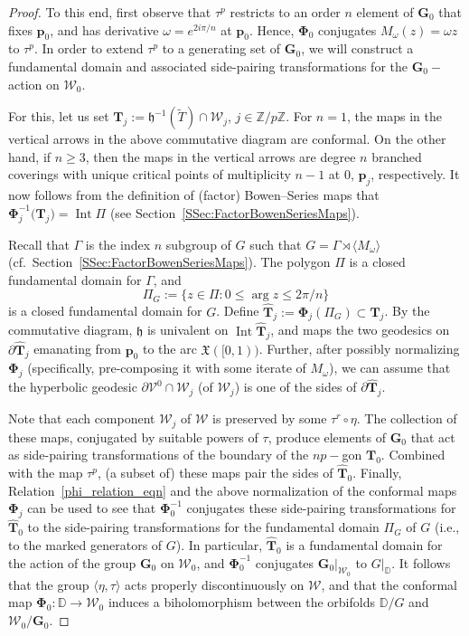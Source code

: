 \documentclass[11pt,a4paper, oneside]{amsart}
\theoremstyle{definition}
\theoremstyle{remark}
\DeclareMathOperator{\Int}{Int}
\numberwithin{equation}{section}
\def\D{{\mathbb{D}}}
\def\Z{{\mathbb{Z}}}
\def\cV{\mathcal {V}}
\def\cW{\mathcal {W}}
\renewcommand{\geq}{\geqslant}
\renewcommand{\leq}{\leqslant}
\renewcommand{\tilde}{\widetilde}
\begin{document}
\begin{proof}
To this end, first observe that $\tau^{p}$ restricts to an order $n$ element of $\pmb{G}_0$ that fixes $\pmb{p}_0$, and has derivative $\omega =e^{2i\pi/n}$ at $\pmb{p}_0$. Hence, $\pmb{\Phi}_0$ conjugates $M_\omega(z)=\omega z$ to $\tau^p$.
In order to extend $\tau^p$ to a generating set of $\pmb{G}_0$, we will construct a fundamental domain and associated side-pairing transformations for the $\pmb{G}_0-$action on $\pmb{\cW}_0$. 

For this, let us
set $\pmb{T}_j:=\mathfrak{h}^{-1}(\tilde T)\cap\pmb{\cW}_j$, $j\in\Z/p\Z$. For $n=1$, the maps in the vertical arrows in the above commutative diagram are conformal. On the other hand, if $n\geq 3$, then the maps in the vertical arrows are degree $n$ branched coverings with unique critical points of multiplicity $n-1$ at $0$, $\pmb{p}_j$, respectively. It now follows from the definition of (factor) Bowen--Series maps that $\pmb{\Phi}_j^{-1}\big(\pmb{T}_j\big)=\Int{\Pi}$ (see Section~\ref{SSec:FactorBowenSeriesMaps}).

Recall that $\Gamma$ is the index $n$ subgroup of $G$ such that $G=\Gamma\rtimes \langle M_\omega\rangle$ (cf.\ Section~\ref{SSec:FactorBowenSeriesMaps}). The polygon $\Pi$ is a closed fundamental domain for $\Gamma$, and
$$
\Pi_G:=\{z\in\Pi:0\leq \arg{z}\leq 2\pi/n\}
$$
is a closed fundamental domain for $G$. Define $\widehat{\pmb{T}}_j:=\pmb{\Phi}_j(\Pi_G)\subset\pmb{T}_j$. By the commutative diagram, $\mathfrak{h}$ is univalent on $\Int{\widehat{\pmb{T}}_j}$, and maps the two geodesics on $\partial \widehat{\pmb{T}}_j$ emanating from $\pmb{p}_0$ to the arc $\mathfrak{X}([0,1))$. Further, after possibly normalizing $\pmb{\Phi}_j$ (specifically, pre-composing it with some iterate of $M_\omega$), we can assume that the hyperbolic geodesic $\partial\cV^0\cap\pmb{\cW}_j$ (of $\pmb{\cW}_j$) is one of the sides of $\partial\widehat{\pmb{T}}_j$.

Note that each component $\pmb{\cW}_j$ of $\pmb{\cW}$ is preserved by some $\tau^r\circ\eta$. The collection of these maps, conjugated by suitable powers of $\tau$, produce elements of $\pmb{G}_0$ that act as side-pairing transformations of the boundary of the $np-$gon $\pmb{T}_0$. Combined with the map $\tau^p$, (a subset of) these maps pair the sides of $\widehat{\pmb{T}}_0$. Finally, Relation~\eqref{phi_relation_eqn} and the above normalization of the conformal maps $\pmb{\Phi}_j$ can be used to see that $\pmb{\Phi}_0^{-1}$ conjugates these side-pairing transformations for $\widehat{\pmb{T}}_0$ to the side-pairing transformations for the fundamental domain $\Pi_G$ of $G$ (i.e., to the marked generators of $G$). In particular, $\widehat{\pmb{T}}_0$ is a fundamental domain for the action of the group $\pmb{G}_0$ on $\pmb{\cW}_0$, and $\pmb{\Phi}_0^{-1}$ conjugates $\pmb{\pmb{G}}_0\vert_{\pmb{\cW}_0}$ to $G\vert_{\D}$. 
It follows that the group $\langle\eta, \tau\rangle$ acts properly discontinuously on $\pmb{\cW}$, and that the conformal map $\pmb{\Phi}_0:\D\to\pmb{\cW}_0$ induces a biholomorphism between the orbifolds $\D/G$ and $\pmb{\cW}_0/\pmb{G}_0$.    
\end{proof}
\end{document}
